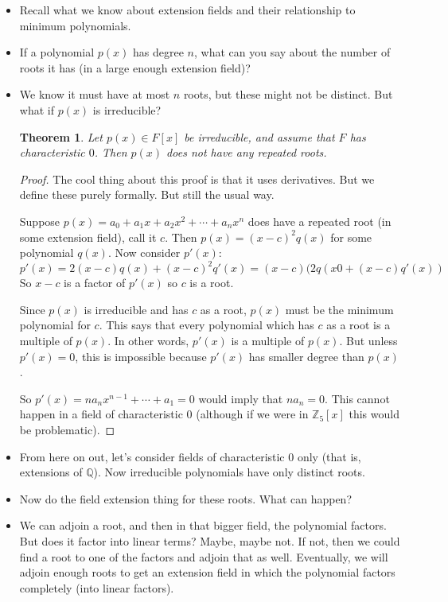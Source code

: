 \documentclass[12pt]{article}
\theoremstyle{plain}
\newtheorem*{theorem}{Theorem}
\theoremstyle{definition}
\theoremstyle{remark}
\def\Z{\mathbb Z}
\def\Q{\mathbb Q}
\begin{document}
\begin{itemize}
\item Recall what we know about extension fields and their relationship to minimum polynomials.
\item If a polynomial $p(x)$ has degree $n$, what can you say about the number of roots it has (in a large enough extension field)?
\item We know it must have at most $n$ roots, but these might not be distinct.  But what if $p(x)$ is irreducible?

\begin{theorem}
Let $p(x) \in F[x]$ be irreducible, and assume that $F$ has characteristic $0$.  Then $p(x)$ does not have any repeated roots.
\end{theorem}

\begin{proof}
The cool thing about this proof is that it uses derivatives.  But we define these purely formally.  But still the usual way.

Suppose $p(x) = a_0 + a_1x + a_2x^2 + \cdots + a_nx^n$ does have a repeated root (in some extension field), call it $c$.  Then $p(x) = (x-c)^2q(x)$ for some polynomial $q(x)$.  Now consider $p'(x)$:
\[p'(x) = 2(x-c)q(x) + (x-c)^2q'(x) = (x-c)(2q(x0 + (x-c)q'(x))\]
So $x-c$ is a factor of $p'(x)$ so $c$ is a root.

Since $p(x)$ is irreducible and has $c$ as a root, $p(x)$ must be the minimum polynomial for $c$.  This says that every polynomial which has $c$ as a root is a multiple of $p(x)$.  In other words, $p'(x)$ is a multiple of $p(x)$.  But unless $p'(x) = 0$, this is impossible because $p'(x)$ has smaller degree than $p(x)$.  

So $p'(x) = na_nx^{n-1} + \cdots + a_1 = 0$ would imply that $na_n = 0$.  This cannot happen in a field of characteristic 0  (although if we were in $\Z_5[x]$ this would be problematic).

\end{proof}

\item From here on out, let's consider fields of characteristic 0 only (that is, extensions of $\Q$).  Now irreducible polynomials have only distinct roots.

\item Now do the field extension thing for these roots.  What can happen?

\item We can adjoin a root, and then in that bigger field, the polynomial factors.  But does it factor into linear terms?  Maybe, maybe not.  If not, then we could find a root to one of the factors and adjoin that as well.  Eventually, we will adjoin enough roots to get an extension field in which the polynomial factors completely (into linear factors).


\end{itemize}
\end{document}

